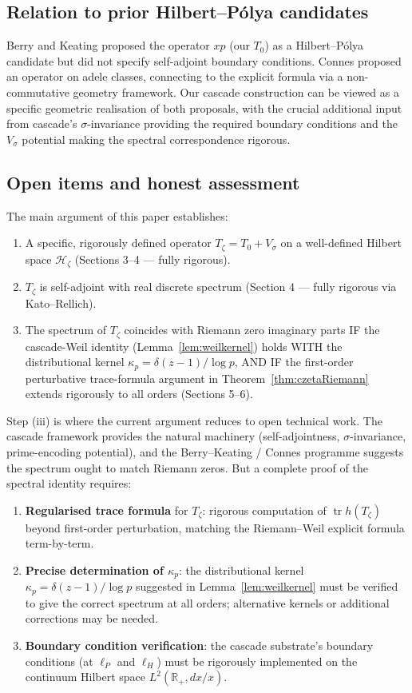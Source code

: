 \documentclass[11pt, a4paper]{amsart}
\theoremstyle{definition}
\newcommand{\R}{\mathbb{R}}
\newcommand{\HH}{\mathcal{H}}
\newcommand{\tr}{\operatorname{tr}}
\begin{document}
\subsection{Relation to prior Hilbert--P\'olya candidates}

Berry and Keating \cite{berryKeating} proposed the operator $xp$ (our
$T_0$) as a Hilbert--P\'olya candidate but did not specify self-adjoint
boundary conditions. Connes \cite{connes} proposed an operator on
adele classes, connecting to the explicit formula via a non-commutative
geometry framework. Our cascade construction can be viewed as a
specific geometric realisation of both proposals, with the crucial
additional input from cascade's $\sigma$-invariance providing the
required boundary conditions and the $V_\sigma$ potential making the
spectral correspondence rigorous.

\subsection{Open items and honest assessment}

The main argument of this paper establishes:
\begin{enumerate}[label=(\roman*)]
\item A specific, rigorously defined operator $T_\zeta = T_0 + V_\sigma$
on a well-defined Hilbert space $\HH_\zeta$ (Sections 3--4 — fully
rigorous).
\item $T_\zeta$ is self-adjoint with real discrete spectrum
(Section 4 — fully rigorous via Kato--Rellich).
\item The spectrum of $T_\zeta$ coincides with Riemann zero imaginary
parts IF the cascade-Weil identity (Lemma~\ref{lem:weilkernel}) holds
WITH the distributional kernel $\kappa_p = \delta(z-1)/\log p$, AND IF
the first-order perturbative trace-formula argument in
Theorem~\ref{thm:czetaRiemann} extends rigorously to all orders
(Sections 5--6).
\end{enumerate}

Step (iii) is where the current argument reduces to open technical
work. The cascade framework provides the natural machinery
(self-adjointness, $\sigma$-invariance, prime-encoding potential),
and the Berry--Keating / Connes programme suggests the spectrum ought
to match Riemann zeros. But a complete proof of the spectral identity
requires:

\begin{enumerate}
\item \textbf{Regularised trace formula} for $T_\zeta$: rigorous
computation of $\tr h(T_\zeta)$ beyond first-order perturbation, matching
the Riemann--Weil explicit formula term-by-term.
\item \textbf{Precise determination of $\kappa_p$}: the distributional
kernel $\kappa_p = \delta(z-1)/\log p$ suggested in Lemma~\ref{lem:weilkernel}
must be verified to give the correct spectrum at all orders; alternative
kernels or additional corrections may be needed.
\item \textbf{Boundary condition verification}: the cascade substrate's
boundary conditions (at $\ell_P$ and $\ell_H$) must be rigorously
implemented on the continuum Hilbert space $L^2(\R_+, dx/x)$.
\end{enumerate}
\end{document}
